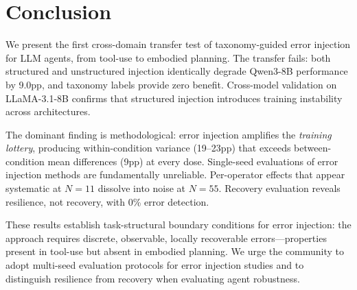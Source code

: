 \documentclass[11pt,a4paper]{article}
\begin{document}
\section{Conclusion}
\label{sec:conclusion}

We present the first cross-domain transfer test of taxonomy-guided error injection for LLM agents, from tool-use to embodied planning.
The transfer fails: both structured and unstructured injection identically degrade Qwen3-8B performance by 9.0pp, and taxonomy labels provide zero benefit.
Cross-model validation on LLaMA-3.1-8B confirms that structured injection introduces training instability across architectures.

The dominant finding is methodological: error injection amplifies the \emph{training lottery}, producing within-condition variance (19--23pp) that exceeds between-condition mean differences (9pp) at every dose.
Single-seed evaluations of error injection methods are fundamentally unreliable.
Per-operator effects that appear systematic at $N{=}11$ dissolve into noise at $N{=}55$.
Recovery evaluation reveals resilience, not recovery, with 0\% error detection.

These results establish task-structural boundary conditions for error injection: the approach requires discrete, observable, locally recoverable errors---properties present in tool-use but absent in embodied planning.
We urge the community to adopt multi-seed evaluation protocols for error injection studies and to distinguish resilience from recovery when evaluating agent robustness.
\end{document}
